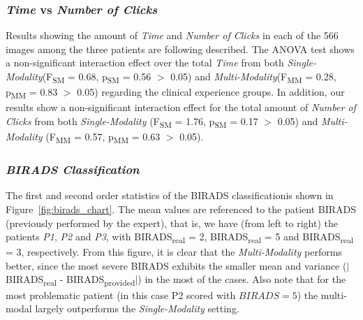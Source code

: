 \balance

\subsubsection{\textit{Time} vs \textit{Number of Clicks}}

Results showing the amount of \textit{Time} and \textit{Number of Clicks} in each of the 566 images among the three patients are following described.
The ANOVA test shows a non-significant interaction effect over the total \textit{Time} from both \textit{Single-Modality}\footnotemark[8] (F\textsubscript{SM} = 0.68, p\textsubscript{SM} = 0.56 $>$ 0.05) and \textit{Multi-Modality}\footnotemark[9] (F\textsubscript{MM} = 0.28, p\textsubscript{MM} = 0.83 $>$ 0.05) regarding the clinical experience groups.
In addition, our results show a non-significant interaction effect for the total amount of \textit{Number of Clicks} from both \textit{Single-Modality} (F\textsubscript{SM} = 1.76, p\textsubscript{SM} = 0.17 $>$ 0.05) and \textit{Multi-Modality} (F\textsubscript{MM} = 0.57, p\textsubscript{MM} = 0.63 $>$ 0.05).




\subsubsection{\textit{BIRADS Classification}}

The first and second order statistics of the BIRADS classification\footnotemark[10] is shown in Figure~\ref{fig:birads_chart}.
The mean values are referenced to the patient BIRADS (previously performed by the expert), that is, we have (from left to right) the patients \textit{P1}, \textit{P2} and \textit{P3}, with BIRADS\textsubscript{real} = 2, BIRADS\textsubscript{real} = 5 and BIRADS\textsubscript{real} = 3, respectively.
From this figure, it is clear that the \textit{Multi-Modality} performs better, since the most severe BIRADS exhibits the smaller mean and variance ($|$BIRADS\textsubscript{real} - BIRADS\textsubscript{provided}$|$) in the most of the cases. Also note that for the most problematic patient (in this case P2 scored with $BIRADS=5$) the multi-modal largely outperforms the \textit{Single-Modality} setting.

